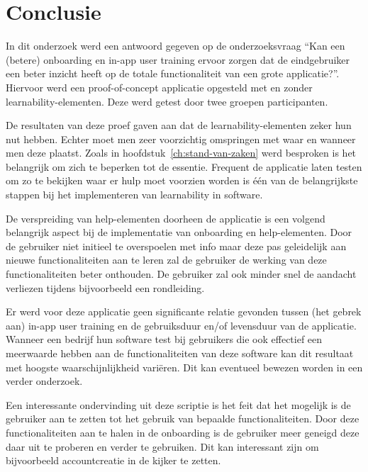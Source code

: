 
\chapter{Conclusie}
\label{ch:conclusie}


In dit onderzoek werd een antwoord gegeven op de onderzoeksvraag ``Kan een (betere) onboarding en in-app user training ervoor zorgen dat de eindgebruiker een beter inzicht heeft op de totale functionaliteit van een grote applicatie?''. Hiervoor werd een proof-of-concept applicatie opgesteld met en zonder learnability-elementen. Deze werd getest door twee groepen participanten.

De resultaten van deze proef gaven aan dat de learnability-elementen zeker hun nut hebben. Echter moet men zeer voorzichtig omspringen met waar en wanneer men deze plaatst. Zoals in hoofdstuk~\ref{ch:stand-van-zaken} werd besproken is het belangrijk om zich te beperken tot de essentie. Frequent de applicatie laten testen om zo te bekijken waar er hulp moet voorzien worden is één van de belangrijkste stappen bij het implementeren van learnability in software.

De verspreiding van help-elementen doorheen de applicatie is een volgend belangrijk aspect bij de implementatie van onboarding en help-elementen. Door de gebruiker niet initieel te overspoelen met info maar deze pas geleidelijk aan nieuwe functionaliteiten aan te leren zal de gebruiker de werking van deze functionaliteiten beter onthouden. De gebruiker zal ook minder snel de aandacht verliezen tijdens bijvoorbeeld een rondleiding.

Er werd voor deze applicatie geen significante relatie gevonden tussen (het gebrek aan) in-app user training en de gebruiksduur en/of levensduur van de applicatie. Wanneer een bedrijf hun software test bij gebruikers die ook effectief een meerwaarde hebben aan de functionaliteiten van deze software kan dit resultaat met hoogste waarschijnlijkheid variëren. Dit kan eventueel bewezen worden in een verder onderzoek.

Een interessante ondervinding uit deze scriptie is het feit dat het mogelijk is de gebruiker aan te zetten tot het gebruik van bepaalde functionaliteiten. Door deze functionaliteiten aan te halen in de onboarding is de gebruiker meer geneigd deze daar uit te proberen en verder te gebruiken. Dit kan interessant zijn om bijvoorbeeld accountcreatie in de kijker te zetten.
